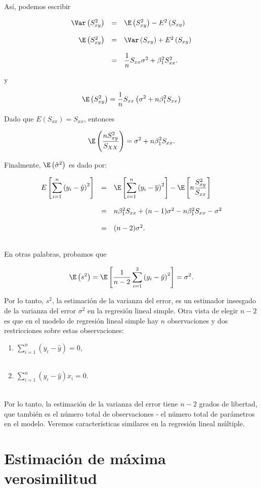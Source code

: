 Así, podemos escribir

$$
\begin{array}{rcl}
    \Var\left(S_{xy}^2\right) &=& \E\left(S_{xy}^2\right)-E^2\left(S_{xy}\right)\\\\
    \E\left(S_{xy}^2\right) &=& \Var\left(S_{xy}\right)+E^2\left(S_{xy}\right)\\\\
			    &=& \dfrac{1}{n}S_{xx}\sigma^2+\beta_{1}^2 S^2_{xx}.

\end{array}
$$

y

$$
\E\left(S_{xy}^2\right)=\dfrac{1}{n}S_{xx}\left(\sigma^2+n\beta_{1}^2 S_{xx}\right)
$$

Dado que $E\left(S_{xx}\right)=S_{xx}$, entonces

$$
\E\left(\dfrac{nS_{xy}^2}{S_{XX}}\right)=\sigma^2+n\beta_{1}^2 S_{xx}.
$$

Finalmente, $\E\left(\hat{\sigma}^2\right)$ es dado por:

$$
\begin{array}{rcl}
    E\left[\displaystyle\sum_{i=1}^n \left(y_i-\hat{y}\right)^2\right] &=& \E\left[\displaystyle\sum_{i=1}^n\left(y_i-\overline{y}\right)^2\right]-\E\left[n\dfrac{S_{xy}^2}{S_{xx}}\right]\\\\
    &=&n\beta_1^2 S_{xx}+(n-1)\sigma^2-n\beta_1^2S_{xx}-\sigma^2\\\\
								      &=&(n-2)\sigma^2.\\\\
\end{array}
$$

En otras palabras, probamos que

\begin{tcolorbox}
    $$\E\left(s^2\right)=\E\left[\dfrac{1}{n-2}\sum_{i=1}^2\left(y_i-\hat{y}\right)^2\right]=\sigma^2.$$
\end{tcolorbox}

Por lo tanto, $s^2$, la estimación de la varianza del error, es un estimador insesgado de la varianza del error $\sigma^2$ en la regresión lineal simple. Otra vista de elegir $n - 2$ es que en el modelo de regresión lineal simple hay $n$ observaciones y dos restricciones sobre estas observaciones:

\begin{enumerate}
    \item $\displaystyle\sum_{i=1}^n \left(y_i-\hat{y}\right)=0$,\\\\
    \item $\displaystyle\sum_{i=1}^n \left(y_i-\hat{y}\right)x_i=0$.\\\\
\end{enumerate}

Por lo tanto, la estimación de la varianza del error tiene $n - 2$ grados de libertad, que también es el número total de observaciones - el número total de parámetros en el modelo. Veremos características similares en la regresión lineal múltiple.


\section{Estimación de máxima verosimilitud}


